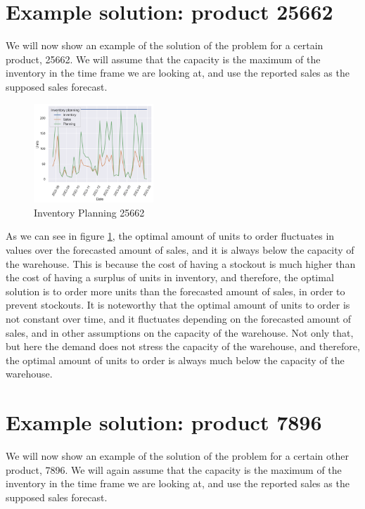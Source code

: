 \documentclass{OptiFlow}
\begin{document}
\section{Example solution: product 25662}
We will now show an example of the solution of the problem for a certain product, 25662.
We will assume that the capacity is the maximum of the inventory in the time frame we are looking at, and use the reported sales 
as the supposed sales forecast.

\begin{figure}[htpb]
	\centering
	\includegraphics[width=0.4\textwidth]{25662.png}
	\caption{Inventory Planning 25662}
	\label{fig:graf1}
\end{figure}

As we can see in figure \ref{fig:graf1}, the optimal amount of units to order 
fluctuates in values over the forecasted amount of sales, and it is always below the capacity of the warehouse.
This is because the cost of having a stockout is much higher than the cost of having a surplus of units in inventory,
and therefore, the optimal solution is to order more units than the forecasted amount of sales, in order to prevent stockouts.
It is noteworthy that the optimal amount of units to order is not constant over time, and it fluctuates depending on the
forecasted amount of sales, and in other assumptions on the capacity of the warehouse. Not only that,
but here the demand does not stress the capacity of the warehouse, and therefore, the optimal amount of units to order is always much below the capacity of the warehouse.

\section{Example solution: product 7896}
We will now show an example of the solution of the problem for a certain other product, 7896.
We will again assume that the capacity is the maximum of the inventory in the time frame we are looking at, and use the reported sales 
as the supposed sales forecast.

\vspace{-2mm}
\end{document}
